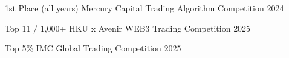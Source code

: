 

\begin{cvhonors}

  \cvhonor
    {1st Place (all years)} %
    {Mercury Capital Trading Algorithm Competition} %
    {} %
    {2024} %

  \cvhonor
    {Top 11 / 1,000+} %
    {HKU x Avenir WEB3 Trading Competition} %
    {} %
    {2025} %

  \cvhonor
    {Top 5\%} %
    {IMC Global Trading Competition} %
    {} %
    {2025} %

\end{cvhonors}
